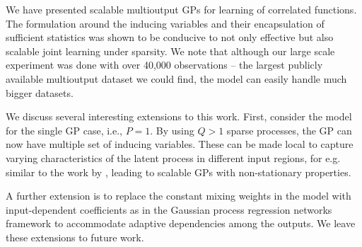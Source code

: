 We have presented scalable multioutput GPs for learning of correlated functions.
The formulation around the inducing variables and their encapsulation of sufficient statistics was shown to be conducive to not only effective but also scalable joint learning under sparsity. 
We note that although our large scale experiment was done with over 40,000 observations -- the largest publicly available multioutput dataset we could find, the model can easily handle much bigger datasets.

We discuss several interesting extensions to this work.
First, consider the model for the single GP case, i.e., $P = 1$. By using $Q > 1$ sparse processes, the GP can now have multiple set of inducing variables.
These can be made local to capture varying characteristics of the latent process in different  input regions, for e.g. similar to the 
work by \citet{nguyen2014fast}, leading to scalable GPs with non-stationary properties. 

A further extension is to replace the constant mixing weights in the model with input-dependent coefficients as in the Gaussian process regression networks framework \citep[GPRN,][]{wilson-et-al-icml-12} to accommodate adaptive dependencies among the outputs.
We leave  these extensions to future work.
